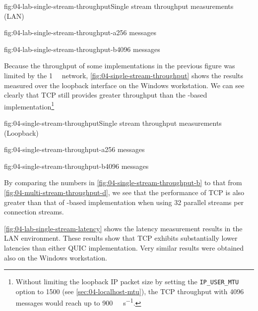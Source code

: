 \begin{myFigure}{fig:04-lab-single-stream-throughput}{Single stream throughput measurements (LAN)}
\begin{mySubfigure}{0.49\linewidth}{fig:04-lab-single-stream-throughput-a}{\SI{256}{\byte} messages}
\footnotesize

\end{mySubfigure}
\begin{mySubfigure}{0.49\linewidth}{fig:04-lab-single-stream-throughput-b}{\SI{4096}{\byte} messages}
\footnotesize

\end{mySubfigure}
\end{myFigure}

Because the throughput of some implementations in the previous figure was limited by the
\SI{1}{\giga\bit} network, \autoref{fig:04-single-stream-throughput} shows the results measured over
the loopback interface on the Windows workstation. We can see clearly that TCP still provides
greater throughput than the \libmsquic{}-based implementation\footnote{Without limiting the loopback
  IP packet size by setting the \texttt{IP_USER_MTU} option to 1500 (see
  \autoref{sec:04-localhost-mtu}), the TCP throughput with \SI{4096}{\byte} messages would reach up
  to \SI[per-mode=symbol]{900}{\mebi\byte\per\second}.}

\begin{myFigure}{fig:04-single-stream-throughput}{Single stream throughput measurements (Loopback)}
\begin{mySubfigure}{0.49\linewidth}{fig:04-single-stream-throughput-a}{\SI{256}{\byte} messages}
\footnotesize

\end{mySubfigure}
\begin{mySubfigure}{0.49\linewidth}{fig:04-single-stream-throughput-b}{\SI{4096}{\byte} messages}
\footnotesize

\end{mySubfigure}
\end{myFigure}

By comparing the numbers in \autoref{fig:04-single-stream-throughput-b} to that from
\autoref{fig:04-multi-stream-throughput-d}, we see that the performance of TCP is also greater than
that of \libmsquic{}-based implementation when using 32 parallel streams per connection streams.

\autoref{fig:04-lab-single-stream-latency} shows the latency measurement results in the LAN
environment. These results show that TCP exhibits substantially lower latencies than either QUIC
implementation. Very similar results were obtained also on the Windows workstation.

